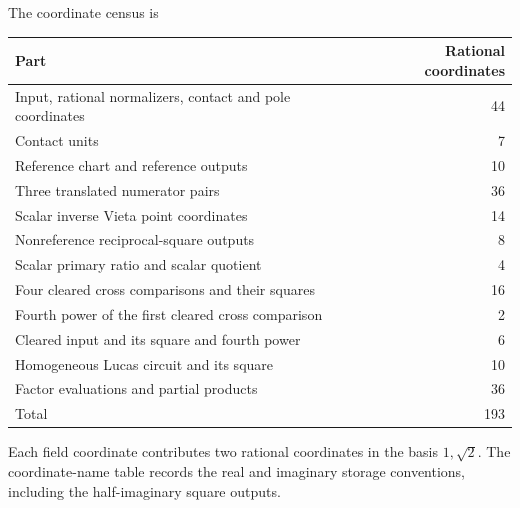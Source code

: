 \documentclass[11pt,a4paper]{article}
\begin{document}
The coordinate census is
\begin{center}
\begin{tabular}{lr}
\hline
Part & Rational coordinates\\\hline
Input, rational normalizers, contact and pole coordinates &44\\
Contact units &7\\
Reference chart and reference outputs &10\\
Three translated numerator pairs &36\\
Scalar inverse Vieta point coordinates &14\\
Nonreference reciprocal-square outputs &8\\
Scalar primary ratio and scalar quotient &4\\
Four cleared cross comparisons and their squares &16\\
Fourth power of the first cleared cross comparison &2\\
Cleared input and its square and fourth power &6\\
Homogeneous Lucas circuit and its square &10\\
Factor evaluations and partial products &36\\\hline
Total &193\\\hline
\end{tabular}
\end{center}
Each field coordinate contributes two rational coordinates in the basis
$1,\sqrt2$. The coordinate-name table records the real and imaginary
storage conventions, including the half-imaginary square outputs.
\end{document}
